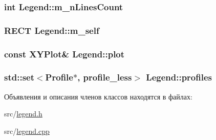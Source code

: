 \hypertarget{class_legend_ac20e23ef899c49a723227dadc21852d0}{
\subsubsection[{m\-\_\-n\-Lines\-Count}]{\setlength{\rightskip}{0pt plus 5cm}int Legend\-::m\-\_\-n\-Lines\-Count\hspace{0.3cm}{\ttfamily [protected]}}}\label{class_legend_ac20e23ef899c49a723227dadc21852d0}
\hypertarget{class_legend_a501285ae1b14654e5ae6a03f7ed4685f}{
\subsubsection[{m\-\_\-self}]{\setlength{\rightskip}{0pt plus 5cm}R\-E\-C\-T Legend\-::m\-\_\-self\hspace{0.3cm}{\ttfamily [protected]}}}\label{class_legend_a501285ae1b14654e5ae6a03f7ed4685f}
\hypertarget{class_legend_ad033e64a43cceb124ce7b626bdfb695b}{
\subsubsection[{plot}]{\setlength{\rightskip}{0pt plus 5cm}const {\bf X\-Y\-Plot}\& Legend\-::plot\hspace{0.3cm}{\ttfamily [protected]}}}\label{class_legend_ad033e64a43cceb124ce7b626bdfb695b}
\hypertarget{class_legend_a418c058072c59c8d2c491852ef3f143b}{
\subsubsection[{profiles}]{\setlength{\rightskip}{0pt plus 5cm}std\-::set$<${\bf Profile}$\ast$, {\bf profile\-\_\-less}$>$ Legend\-::profiles\hspace{0.3cm}{\ttfamily [protected]}}}\label{class_legend_a418c058072c59c8d2c491852ef3f143b}


Объявления и описания членов классов находятся в файлах\-:\begin{DoxyCompactItemize}
\item 
src/\hyperlink{legend_8h}{legend.\-h}\item 
src/\hyperlink{legend_8cpp}{legend.\-cpp}\end{DoxyCompactItemize}
